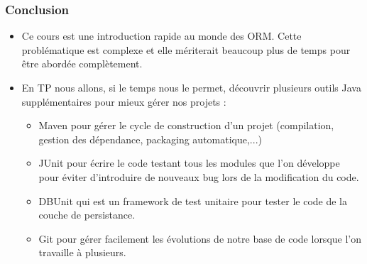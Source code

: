 \documentclass[xcolor=pdftex,x11names,table]{beamer}
\begin{document}
  \begin{frame}
    \frametitle{Conclusion}
    \begin{itemize}
      \item Ce cours est une introduction rapide au monde des ORM. Cette problématique est complexe et elle mériterait 
      beaucoup plus de temps pour être abordée complètement.
      \item En TP nous allons, si le temps nous le permet, découvrir plusieurs outils Java supplémentaires pour mieux gérer nos projets :
          \begin{itemize}
      			\item Maven pour gérer le cycle de construction d'un projet (compilation, gestion des dépendance, packaging automatique,...)
      			\item JUnit pour écrire le code testant tous les modules que l'on développe pour éviter d'introduire de nouveaux bug lors de 
      			la modification du code.
      			\item DBUnit qui est un framework de test unitaire pour tester le code de la couche de persistance.
      			\item Git pour gérer facilement les évolutions de notre base de code lorsque l'on travaille à plusieurs. 
    			\end{itemize}
    \end{itemize}
  \end{frame}
  
\end{document}
